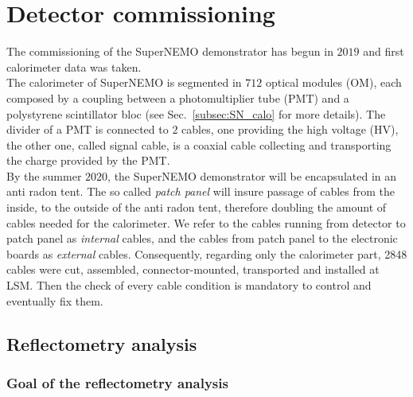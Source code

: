 \chapter{Detector commissioning}
\label{ch:commissioning}

The commissioning of the SuperNEMO demonstrator has begun in $2019$ and first calorimeter data was taken.\\
The calorimeter of SuperNEMO is segmented in $712$ optical modules (OM), each composed by a coupling between a photomultiplier tube (PMT) and a polystyrene scintillator bloc (see Sec.~\ref{subsec:SN_calo} for more details).
The divider of a PMT is connected to $2$ cables, one providing the high voltage (HV), the other one, called signal cable, is a coaxial cable collecting and transporting the charge provided by the PMT.\\
By the summer $2020$, the SuperNEMO demonstrator will be encapsulated in an anti radon tent.
The so called \emph{patch panel} will insure passage of cables from the inside, to the outside of the anti radon tent, therefore doubling the amount of cables needed for the calorimeter.
We refer to the cables running from detector to patch panel as \emph{internal} cables, and the cables from patch panel to the electronic boards as \emph{external} cables.
Consequently, regarding only the calorimeter part, 2848 cables were cut, assembled, connector-mounted, transported and installed at LSM.
Then the check of every cable condition is mandatory to control and eventually fix them.

\section{Reflectometry analysis}
\label{sec:reflecto}

\subsection{Goal of the reflectometry analysis}

